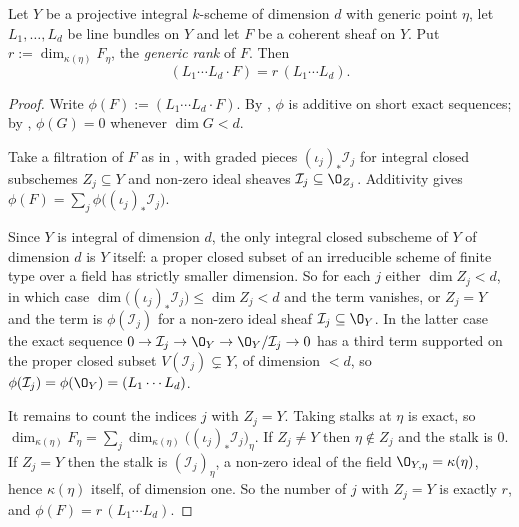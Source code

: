 \begin{proposition}
\label{prop:deg-intersection-rank}
Let $Y$ be a projective integral $k$-scheme of dimension $d$ with generic point
$\eta$, let $L_1,\dots,L_d$ be line bundles on $Y$ and let $F$ be a coherent
sheaf on $Y$.  Put $r:=\dim_{\kappa(\eta)}F_\eta$, the \emph{generic rank} of
$F$.  Then
\[
  (L_1\cdots L_d\cdot F)=r\,(L_1\cdots L_d).
\]
\end{proposition}
\begin{proof}
Write $\phi(F):=(L_1\cdots L_d\cdot F)$.  By
, $\phi$ is additive on short exact
sequences; by , $\phi(G)=0$ whenever
$\dim G<d$.

Take a filtration of $F$ as in , with graded pieces
$(\iota_j)_*\mathcal I_j$ for integral closed subschemes $Z_j\subseteq Y$ and
non-zero ideal sheaves $\mathcal I_j\subseteq\O_{Z_j}$.  Additivity gives
$\phi(F)=\sum_j\phi\bigl((\iota_j)_*\mathcal I_j\bigr)$.

Since $Y$ is integral of dimension $d$, the only integral closed subscheme of
$Y$ of dimension $d$ is $Y$ itself: a proper closed subset of an irreducible
scheme of finite type over a field has strictly smaller dimension.  So for
each $j$ either $\dim Z_j<d$, in which case
$\dim\bigl((\iota_j)_*\mathcal I_j\bigr)\leq\dim Z_j<d$ and the term vanishes,
or $Z_j=Y$ and the term is $\phi(\mathcal I_j)$ for a non-zero ideal sheaf
$\mathcal I_j\subseteq\O_Y$.  In the latter case the exact sequence
$0\to\mathcal I_j\to\O_Y\to\O_Y/\mathcal I_j\to0$ has a third term supported on
the proper closed subset $V(\mathcal I_j)\subsetneq Y$, of dimension $<d$, so
$\phi(\mathcal I_j)=\phi(\O_Y)=(L_1\cdots L_d)$.

It remains to count the indices $j$ with $Z_j=Y$.  Taking stalks at $\eta$ is
exact, so
$\dim_{\kappa(\eta)}F_\eta=\sum_j\dim_{\kappa(\eta)}\bigl((\iota_j)_*\mathcal
I_j\bigr)_\eta$.  If $Z_j\neq Y$ then $\eta\notin Z_j$ and the stalk is $0$.
If $Z_j=Y$ then the stalk is $(\mathcal I_j)_\eta$, a non-zero ideal of the
field $\O_{Y,\eta}=\kappa(\eta)$, hence $\kappa(\eta)$ itself, of dimension
one.  So the number of $j$ with $Z_j=Y$ is exactly $r$, and
$\phi(F)=r\,(L_1\cdots L_d)$.
\end{proof}

